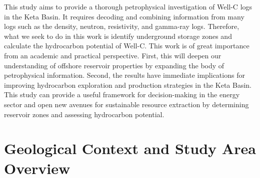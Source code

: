 \documentclass{gji}
\begin{document}
This study aims to provide a thorough petrophysical investigation of Well-C logs in the Keta Basin.
It requires decoding and combining information from many logs such as the density, neutron, resistivity, and gamma-ray logs.
Therefore, what we seek to do in this work is identify underground storage zones and calculate the hydrocarbon potential of Well-C.
This work is of great importance from an academic and practical perspective.
First, this will deepen our understanding of offshore reservoir properties by expanding the body of petrophysical information.
Second, the results have immediate implications for improving hydrocarbon exploration and production strategies in the Keta Basin. 
 This study can provide a useful framework for decision-making in the energy sector and open new avenues for sustainable resource extraction by determining reservoir zones and assessing hydrocarbon potential.


\section{Geological Context and Study Area Overview}\label{sec:study_area}
\end{document}
